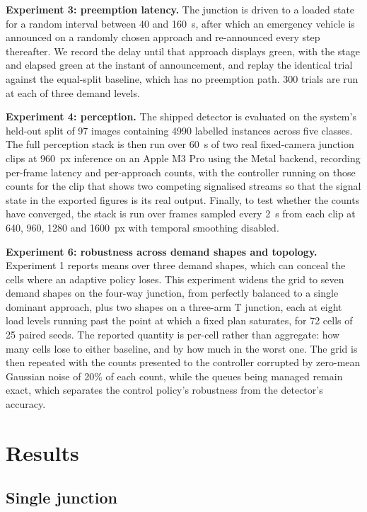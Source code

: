 \documentclass[journal]{IEEEtran}
\begin{document}
\textbf{Experiment 3: preemption latency.} The junction is driven to a loaded state for a random
interval between 40 and 160~s, after which an emergency vehicle is announced on a randomly chosen
approach and re-announced every step thereafter. We record the delay until that approach displays green,
with the stage and elapsed green at the instant of announcement, and replay the identical trial against
the equal-split baseline, which has no preemption path. 300 trials are run at each of three demand
levels.

\textbf{Experiment 4: perception.} The shipped detector is evaluated on the system's held-out split of 97
images containing 4990 labelled instances across five classes. The full perception stack is then run over
60~s of two real fixed-camera junction clips at 960~px inference on an Apple M3 Pro using the Metal
backend, recording per-frame latency and per-approach counts, with the controller running on those counts
for the clip that shows two competing signalised streams so that the signal state in the exported figures
is its real output. Finally, to test whether the counts have converged, the stack is run over frames
sampled every 2~s from each clip at 640, 960, 1280 and 1600~px with temporal smoothing disabled.

\textbf{Experiment 6: robustness across demand shapes and topology.} Experiment 1 reports means over
three demand shapes, which can conceal the cells where an adaptive policy loses. This experiment
widens the grid to seven demand shapes on the four-way junction, from perfectly balanced to a single
dominant approach, plus two shapes on a three-arm T junction, each at eight load levels running past
the point at which a fixed plan saturates, for 72 cells of 25 paired seeds. The reported quantity is
per-cell rather than aggregate: how many cells lose to either baseline, and by how much in the worst
one. The grid is then repeated with the counts presented to the controller corrupted by zero-mean
Gaussian noise of 20\% of each count, while the queues being managed remain exact, which separates
the control policy's robustness from the detector's accuracy.

\section{Results}
\label{sec:results}

\subsection{Single junction}
\end{document}
